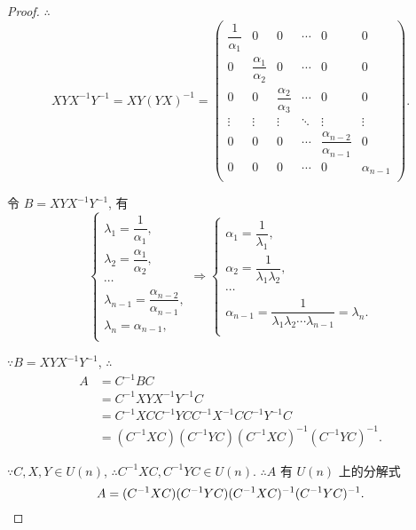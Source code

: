 \documentclass{ctexart}
\begin{document}
\begin{proof}
    $\therefore$
    \[XYX^{-1}Y^{-1}=XY(YX)^{-1}=\begin{pmatrix}
        \dfrac{1}{\alpha_1} & 0 & 0 & \cdots & 0 & 0 \\
        0 & \dfrac{\alpha_1}{\alpha_2} & 0 & \cdots & 0 & 0 \\
        0 & 0 & \dfrac{\alpha_2}{\alpha_3} & \cdots & 0 & 0 \\
        \vdots & \vdots & \vdots & \ddots & \vdots & \vdots \\
        0 & 0 & 0 & \cdots & \dfrac{\alpha_{n-2}}{\alpha_{n-1}} & 0 \\
        0 & 0 & 0 & \cdots & 0 & \alpha_{n-1} \\
    \end{pmatrix}.\]

    令 $B=XYX^{-1}Y^{-1}$, 有
    \[\begin{cases}
        \lambda_1=\dfrac{1}{\alpha_1}, \\[8pt]
        \lambda_2=\dfrac{\alpha_1}{\alpha_2}, \\
        \cdots \\
        \lambda_{n-1}=\dfrac{\alpha_{n-2}}{\alpha_{n-1}}, \\
        \lambda_n=\alpha_{n-1}, \\
    \end{cases}\Rightarrow\begin{cases}
        \alpha_1=\dfrac{1}{\lambda_1}, \\[8pt]
        \alpha_2=\dfrac{1}{\lambda_1\lambda_2}, \\
        \cdots \\
        \alpha_{n-1}=\dfrac{1}{\lambda_1\lambda_2\cdots\lambda_{n-1}}=\lambda_n. \\
    \end{cases}\]

    $\because B=XYX^{-1}Y^{-1}$, $\therefore$
    \begin{align*}
        A & =C^{-1}BC \\
        & =C^{-1}XYX^{-1}Y^{-1}C \\
        & =C^{-1}XCC^{-1}YCC^{-1}X^{-1}CC^{-1}Y^{-1}C \\
        & =(C^{-1}XC)(C^{-1}YC)(C^{-1}XC)^{-1}(C^{-1}YC)^{-1}.
    \end{align*}

    $\because C,X,Y\in U(n)$, $\therefore C^{-1}XC,C^{-1}YC\in U(n)$. $\therefore A$ 有 $U(n)$ 上的分解式
    \[A=(C^{-1}XC)(C^{-1}YC)(C^{-1}XC)^{-1}(C^{-1}YC)^{-1}.\qedhere\]
\end{proof}
\end{document}
